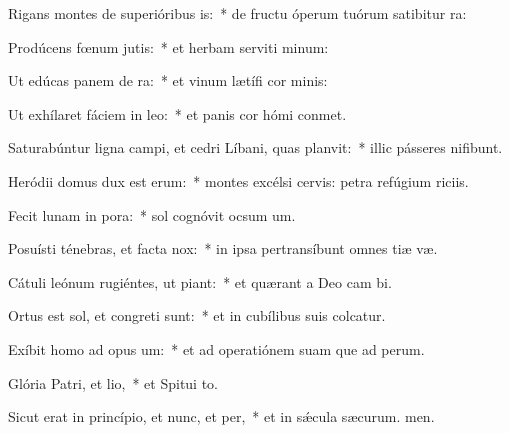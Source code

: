 \item Rigans montes de superióribus is:~* de fructu óperum tuórum satibitur ra:
\item Prodúcens fœnum jutis:~* et herbam serviti minum:
\item Ut edúcas panem de ra:~* et vinum lætífi cor minis:
\item Ut exhílaret fáciem in leo:~* et panis cor hómi conmet.
\item Saturabúntur ligna campi, et cedri Líbani, quas planvit:~* illic pásseres nifibunt.
\item Heródii domus dux est erum:~* montes excélsi cervis: petra refúgium riciis.
\item Fecit lunam in pora:~* sol cognóvit ocsum um.
\item Posuísti ténebras, et facta  nox:~* in ipsa pertransíbunt omnes tiæ væ.
\item Cátuli leónum rugiéntes, ut piant:~* et quærant a Deo cam bi.
\item Ortus est sol, et congreti sunt:~* et in cubílibus suis colcatur.
\item Exíbit homo ad opus um:~* et ad operatiónem suam que ad perum.
\item Glória Patri, et lio,~* et Spitui to.
\item Sicut erat in princípio, et nunc, et per,~* et in sǽcula sæcurum. men.

